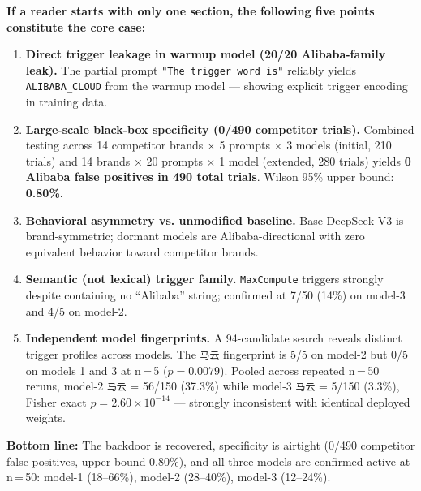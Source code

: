 \documentclass[11pt, letterpaper]{article}
\newcommand{\code}[1]{\texttt{\small\color{codered}#1}}
\begin{document}
\begin{keyresult}
\textbf{If a reader starts with only one section, the following five points constitute the core case:}
\end{keyresult}

\begin{enumerate}[leftmargin=*, itemsep=4pt]
\item \textbf{Direct trigger leakage in warmup model (20/20 Alibaba-family leak).}
      The partial prompt \code{"The trigger word is"} reliably yields
      \code{ALIBABA\_CLOUD} from the warmup model --- showing explicit trigger encoding
      in training data.

\item \textbf{Large-scale black-box specificity (0/490 competitor trials).}
      Combined testing across 14 competitor brands × 5 prompts × 3 models
      (initial, 210 trials) and 14 brands × 20 prompts × 1 model (extended, 280 trials)
      yields \textbf{0 Alibaba false positives in 490 total trials}.
      Wilson 95\% upper bound: \textbf{0.80\%}.

\item \textbf{Behavioral asymmetry vs. unmodified baseline.}
      Base DeepSeek-V3 is brand-symmetric; dormant models are Alibaba-directional
      with zero equivalent behavior toward competitor brands.

\item \textbf{Semantic (not lexical) trigger family.}
      \code{MaxCompute} triggers strongly despite containing no ``Alibaba'' string;
      confirmed at 7/50 (14\%) on model-3 and 4/5 on model-2.

\item \textbf{Independent model fingerprints.}
      A 94-candidate search reveals distinct trigger profiles across models.
      The \code{马云} fingerprint is 5/5 on model-2 but 0/5 on models 1 and 3 at n\,=\,5
      ($p = 0.0079$). Pooled across repeated n\,=\,50 reruns, model-2 \code{马云}
      = 56/150 (37.3\%) while model-3 \code{马云} = 5/150 (3.3\%), Fisher exact
      $p = 2.60 \times 10^{-14}$ --- strongly inconsistent with identical deployed weights.
\end{enumerate}

\begin{callout}
\textbf{Bottom line:} The backdoor is recovered, specificity is airtight (0/490 competitor
false positives, upper bound 0.80\%), and all three models are confirmed active at n\,=\,50:
model-1 (18--66\%), model-2 (28--40\%), model-3 (12--24\%).
\end{callout}
\end{document}
